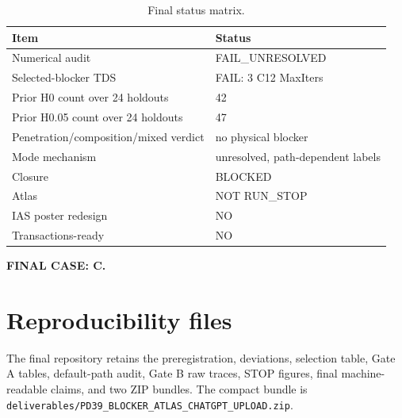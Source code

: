 \documentclass[10pt]{article}
\newcommand{\code}[1]{\texttt{#1}}
\begin{document}
\begin{table}[h]
\centering
\caption{Final status matrix.}
\begin{tabular}{ll}
\toprule
Item & Status\\
\midrule
Numerical audit & FAIL\_UNRESOLVED\\
Selected-blocker TDS & FAIL: 3 C12 MaxIters\\
Prior H0 count over 24 holdouts & 42\\
Prior H0.05 count over 24 holdouts & 47\\
Penetration/composition/mixed verdict & no physical blocker\\
Mode mechanism & unresolved, path-dependent labels\\
Closure & BLOCKED\\
Atlas & NOT RUN\_STOP\\
IAS poster redesign & NO\\
Transactions-ready & NO\\
\bottomrule
\end{tabular}
\end{table}

\textbf{FINAL CASE: C.}

\section*{Reproducibility files}

The final repository retains the preregistration, deviations, selection table,
Gate A tables, default-path audit, Gate B raw traces, STOP figures, final
machine-readable claims, and two ZIP bundles. The compact bundle is
\code{deliverables/PD39\_BLOCKER\_ATLAS\_CHATGPT\_UPLOAD.zip}.
\end{document}
